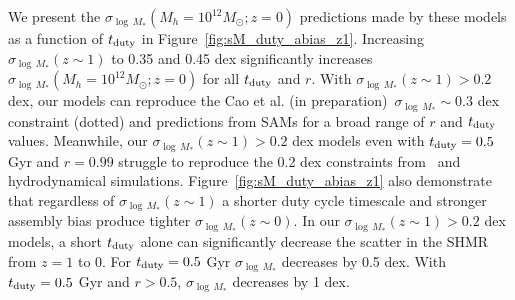 \documentclass[12pt, letterpaper, preprint, tighten]{aastex62}
\newcommand{\edt}[1]{{\color{dred}{\bf} #1}}
\newcommand{\cao}{Cao et al. (in preparation)}
\newcommand{\tduty}{t_{\rm duty}}
\begin{document}
\edt{
We present the $\sigma_{\log\,M_*}(M_h=10^{12}M_\odot; z=0)$
predictions made by these models as a function of $\tduty$ in
Figure~\ref{fig:sM_duty_abias_z1}. Increasing $\sigma_{\log\,M_*}(z\sim1)$
to 0.35 and 0.45 dex significantly increases $\sigma_{\log\,M_*}(M_h=10^{12}M_\odot; z=0)$
for all $\tduty$ and $r$.
With $\sigma_{\log\,M_*}(z\sim1) > 0.2$ dex, our models can reproduce
the \cao~$\sigma_{\log\,M_*}\sim 0.3$ dex constraint (dotted) and predictions
from SAMs for a broad range of $r$ and $\tduty$ values. Meanwhile, our
$\sigma_{\log\,M_*}(z\sim1) > 0.2$ dex models even with $\tduty = 0.5$ Gyr
and $r=0.99$ struggle to reproduce the 0.2 dex constraints from~\cite{more2011, leauthaud2012, reddick2013, tinker2013, zu2015}
and hydrodynamical simulations.
Figure~\ref{fig:sM_duty_abias_z1} also demonstrate that regardless of
$\sigma_{\log\,M_*}(z\sim1)$ a shorter duty cycle timescale and stronger
assembly bias produce tighter $\sigma_{\log\,M_*}(z\sim0)$. In our
$\sigma_{\log\,M_*}(z\sim1) > 0.2$ dex models, a short $\tduty$ alone can
significantly decrease the scatter in the SHMR from $z=1$ to 0. For
$\tduty=0.5$ Gyr $\sigma_{\log\,M_*}$ decreases by 0.5 dex. With
$\tduty=0.5$ Gyr and $r > 0.5$, $\sigma_{\log\,M_*}$ decreases by 1 dex.
}
\end{document}
